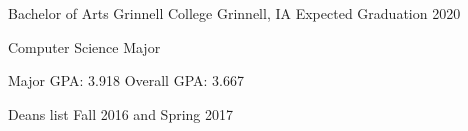 \documentclass[12pt, a4paper]{awesome-cv}
\begin{document}
\makecvheader


\begin{cventries}
  \cventry
    {Bachelor of Arts}
    {Grinnell College}
    {Grinnell, IA}
    {Expected Graduation 2020}
    {
      \begin{cvitems}
	\item{Computer Science Major}
	\item{Major GPA: 3.918 \quad Overall GPA: 3.667}
        \item {Deans list Fall 2016 and Spring 2017}
      \end{cvitems}
    }
\end{cventries}
\end{document}
